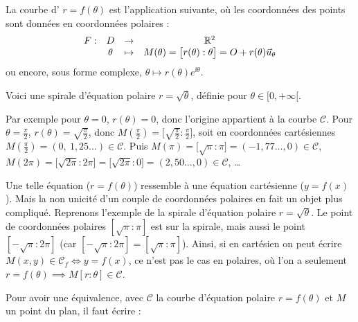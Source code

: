 \documentclass[class=report,crop=false]{standalone}
\begin{document}
La courbe d' $r=f(\theta)$
est l'application suivante, où les coordonnées des
points sont données en coordonnées polaires :
$$\begin{array}{cccc}
F :&D&\rightarrow&\mathbb{R}^2\\
 &\theta&\mapsto&M(\theta) = \big[r(\theta):\theta\big] = O+r(\theta)\vec{u}_\theta
\end{array}
$$
ou encore, sous forme complexe, $\theta \mapsto r(\theta)e^{\ii\theta}$.




\begin{exemple}
Voici une spirale d'équation polaire $r = \sqrt{\theta}$,
définie pour $\theta \in [0,+\infty[$.

Par exemple pour $\theta = 0$, $r(\theta)= 0$,
donc l'origine appartient à la courbe $\mathcal{C}$.
Pour $\theta=\frac\pi2$, $r(\theta)=\sqrt{\frac\pi2}$, donc
$M(\frac\pi2) = \big[\sqrt{\frac\pi2} : \frac\pi2\big]$,
soit en coordonnées cartésiennes
$M(\frac\pi2) = (0,\  1,25\ldots) \in \mathcal{C}$.
Puis $M(\pi) = \big[\sqrt\pi : \pi\big] = (-1,77\ldots,0) \in \mathcal{C}$,
$M(2\pi) = \big[\sqrt{2\pi} : 2\pi\big]= \big[\sqrt{2\pi} : 0\big]
= (2,50\ldots,0) \in \mathcal{C}$,
\ldots


\end{exemple}



Une telle équation ($r=f(\theta)$) ressemble à une équation cartésienne
($y=f(x)$). Mais la non unicité d'un couple de coordonnées polaires
en fait un objet plus compliqué.
Reprenons l'exemple de la spirale d'équation polaire $r=\sqrt\theta$.
Le point de coordonnées polaires $[\sqrt{\pi}:\pi]$
est sur la spirale, mais aussi le point
$[-\sqrt{\pi}:2\pi]$ (car $[-\sqrt{\pi}:2\pi]=[\sqrt{\pi}:\pi]$).
Ainsi, si en cartésien on peut écrire
$M(x,y)\in\mathcal{C}_f\iff y=f(x)$,
ce n'est pas le cas en polaires, où l'on a seulement
$r=f(\theta) \implies M[r:\theta]\in\mathcal{C}$.

Pour avoir une équivalence, avec $\mathcal{C}$
la courbe d'équation polaire $r=f(\theta)$ et $M$ un point du plan,
il faut écrire :
\end{document}

